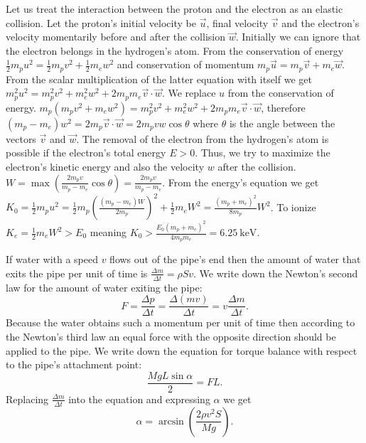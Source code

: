 \documentclass[11pt]{article}
\begin{document}
\solueng
Let us treat the interaction between the proton and the electron as an elastic collision. Let the proton’s initial velocity be $\vec{u}$, final velocity $\vec{v}$ and the electron’s velocity momentarily before and after the collision $\vec{w}$. Initially we can ignore that the electron belongs in the hydrogen’s atom. From the conservation of energy $\frac{1}{2}m_p u^2 = \frac{1}{2}m_p v^2 + \frac{1}{2}m_e w^2$ and conservation of momentum $m_p \vec{u} = m_p \vec{v} + m_e \vec{w}$. From the scalar multiplication of the latter equation with itself we get $m_p^2 u^2 = m_p^2 v^2 + m_e^2 w^2 + 2 m_p m_e \vec{v}\cdot \vec{w}$. We replace $u$ from the conservation of energy. $m_p ( m_p v^2 + m_e w^2 ) = m_p^2 v^2 + m_e^2 w^2 + 2 m_p m_e \vec{v}\cdot \vec{w}$, therefore $( m_p - m_e ) w^2 = 2 m_p \vec{v}\cdot\vec{w} = 2 m_p vw \cos\theta$ where $\theta$ is the angle between the vectors $\vec{v}$ and $\vec{w}$. The removal of the electron from the hydrogen’s atom is possible if the electron’s total energy $E>0$. Thus, we try to maximize the electron’s kinetic energy and also the velocity $w$ after the collision. $W = \max\left(\frac{2 m_p v}{m_p - m_e}\cos\theta\right) = \frac{2 m_p v}{m_p - m_e}$. From the energy’s equation we get $K_0 = \frac{1}{2}m_p u^2 = \frac{1}{2}m_p \left(\frac{( m_p - m_e ) W}{2 m_p}\right)^2 + \frac{1}{2}m_e W^2 = \frac{(m_p + m_e)^2}{8 m_p} W^2$. To ionize $K_e = \frac{1}{2}m_e W^2 > E_0$ meaning $K_0 > \frac{E_0 (m_p + m_e)^2}{4 m_p m_e} = \SI{6.25}{\kilo\electronvolt}$.
\probend
\bigskip


\solueng
If water with a speed $v$ flows out of the pipe’s end then the amount of water that exits the pipe per unit of time is $\frac{\Delta m}{\Delta t}=\rho S v$. We write down the Newton’s second law for the amount of water exiting the pipe:
\[ F=\frac{\Delta p}{\Delta t}=\frac{\Delta(mv)}{\Delta t}=v \frac{\Delta m}{\Delta t}. \] 
Because the water obtains such a momentum per unit of time then according to the Newton’s third law an equal force with the opposite direction should be applied to the pipe. We write down the equation for torque balance with respect to the pipe’s attachment point:
\[ \frac{MgL\sin \alpha}{2}=FL. \] 
Replacing $\frac{\Delta m}{\Delta t}$ into the equation and expressing $\alpha$ we get
\[ \alpha=\arcsin (\frac{2\rho v^2 S}{Mg}). \]
\probend
\bigskip
\end{document}
